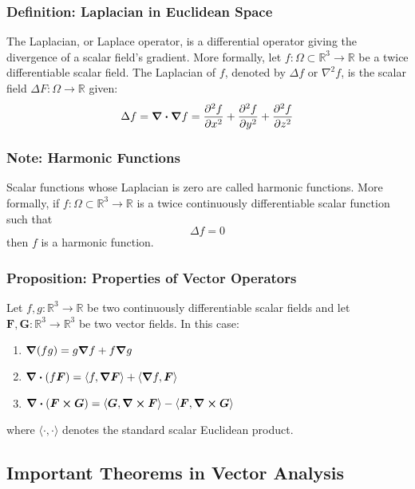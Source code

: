 \documentclass[11pt, a4paper]{article}
\begin{document}
\subsubsection{Definition: Laplacian in Euclidean Space}
The Laplacian, or Laplace operator, is a differential operator giving the divergence of a scalar field's gradient. More formally, let $ f : \Omega \subset \mathbb{R}^3 \to \mathbb{R} $ be a twice differentiable scalar field. The Laplacian of $ f $, denoted by $ \Delta f $ or $ \nabla^2 f $, is the scalar field $ \Delta{F} : \Omega \to \mathbb{R}$ given:
\begin{equation*}
	\Delta f = \div{\grad{f}} = \pdv[2]{f}{x} + \pdv[2]{f}{y} + \pdv[2]{f}{z}
\end{equation*}

\subsubsection{Note: Harmonic Functions}
Scalar functions whose Laplacian is zero are called harmonic functions. More formally, if $ f : \Omega \subset \mathbb{R}^3 \to \mathbb{R} $ is a twice continuously differentiable scalar function such that
\begin{equation*}
	\Delta f = 0
\end{equation*}
then $ f $ is a harmonic function.

\subsubsection{Proposition: Properties of Vector Operators}
Let $ f, g: \mathbb{R}^3 \to \mathbb{R} $ be two continuously differentiable scalar fields and let $ \bm{F}, \bm{G}: \mathbb{R}^3 \to \mathbb{R}^3 $ be two vector fields. In this case:
\begin{enumerate}
	\item $ \grad(fg)  = g\grad{f} + f\grad{g}$
	\item $\div(f \bm{F}) = \langle {f}, \grad\bm{F} \rangle + \langle \grad{f}, \bm{F} \rangle $ 
	\item $ \div (\bm{F} \cross \bm{G}) = \left \langle \bm{G}, \curl{\bm{F}} \right \rangle - \left \langle \bm{F}, \curl{\bm{G}} \right  \rangle $
\end{enumerate}
where $ \langle \cdot, \cdot \rangle $ denotes the standard scalar Euclidean product.

\subsection{Important Theorems in Vector Analysis}
\end{document}
